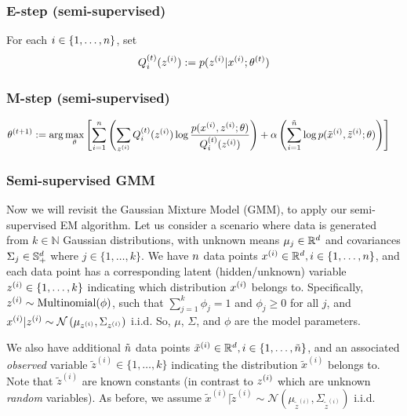 \subsubsection*{E-step (semi-supervised)}

For each $i \in \{1,\ldots,{n}\}$, set
\begin{align*}
    Q_i^{(t)}(z^{(i)}) := p(z^{(i)}\vert x^{(i)};\theta^{(t)})
\end{align*}

\subsubsection*{M-step (semi-supervised)}

\begin{align*}
    \theta^{(t+1)} &:= \arg\max_\theta\left[ \sum_{i=1}^{n}\left( \sum_{z^{(i)}} Q^{(t)}_i(z^{(i)}) \log \frac{ p(x^{(i)}, z^{(i)};\theta) }{ Q^{(t)}_i(z^{(i)})}\right)  + \alpha \left(\sum_{i=1}^{\tilde{{n}}} \log p(\tilde{x}^{(i)},\tilde{z}^{(i)};\theta)\right)\right]
\end{align*}

\begin{enumerate}
  

\end{enumerate}


\subsubsection*{Semi-supervised GMM}
Now we will revisit the Gaussian Mixture Model (GMM), to apply our semi-supervised EM algorithm. Let us consider a scenario where data is generated from $k \in \mathbb{N}$ Gaussian distributions, with unknown means $\mu_j \in \mathbb{R}^{d}$ and covariances $\Sigma_j \in \mathbb{S}_+^{d}$ where $j \in \{1,\ldots,k\}$. We have ${n}$ data points $x^{(i)} \in \mathbb{R}^{d}, i \in \{1,\ldots,{n}\}$, and each data point has a corresponding latent (hidden/unknown) variable $z^{(i)} \in \{1,\ldots,k\}$ indicating which distribution $x^{(i)}$ belongs to. Specifically, $z^{(i)} \sim \text{Multinomial}(\phi)$, such that $\sum_{j=1}^k\phi_j = 1$ and $\phi_j \ge 0$ for all $j$, and $x^{(i)}\vert z^{(i)} \sim \mathcal{N}\left(\mu_{z^{(i)}}, \Sigma_{z^{(i)}}\right)$ i.i.d. So, $\mu$, $\Sigma$, and $\phi$ are the model parameters.

We also have additional $\tilde{{n}}$ data points $\tilde{x}^{(i)} \in \mathbb{R}^{d}, i \in \{1,\ldots,\tilde{{n}}\}$, and an associated \emph{observed} variable $\tilde{z}^{(i)} \in \{1,\ldots,k\}$ indicating the distribution $\tilde{x}^{(i)}$ belongs to. Note that $\tilde{z}^{(i)}$ are known constants (in contrast to $z^{(i)}$ which are unknown \emph{random} variables). As before, we assume $\tilde{x}^{(i)}\vert \tilde{z}^{(i)} \sim \mathcal{N}\left(\mu_{\tilde{z}^{(i)}}, \Sigma_{\tilde{z}^{(i)}}\right)$ i.i.d.


